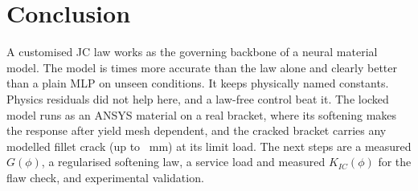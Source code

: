 \documentclass[conference]{IEEEtran}
\begin{document}
\section{Conclusion}
A customised JC law works as the governing backbone of a neural material model. The model is \nImprovement{} times more accurate than the law alone and clearly better than a plain MLP on unseen conditions. It keeps physically named constants. Physics residuals did not help here, and a law-free control beat it. The locked model runs as an ANSYS material on a real bracket, where its softening makes the response after yield mesh dependent, and the cracked bracket carries any modelled fillet crack (up to \nClCrackMax~mm) at its limit load. The next steps are a measured $G(\phi)$, a regularised softening law, a service load and measured $K_{IC}(\phi)$ for the flaw check, and experimental validation.



\end{document}
